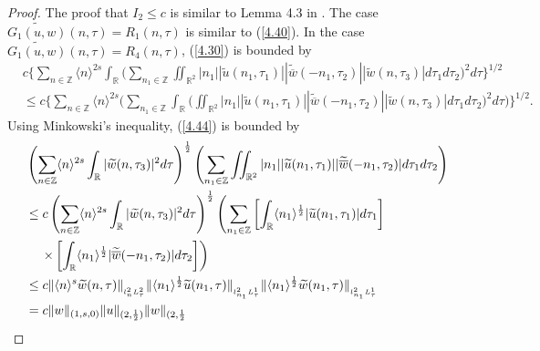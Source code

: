 \documentclass[reqno]{amsart}
\numberwithin{equation}{section}
\begin{document}
\begin{proof}
The proof that $I_{2}\leq c$ is similar to Lemma 4.3 in \cite{38}.
The case $\widetilde{G_{1}(u,w)}(n,\tau)=R_{1}(n,\tau)$ is similar to (\ref{4.40}). In the case
$\widetilde{G_{1}(u,w)}(n,\tau)=R_{4}(n,\tau)$, (\ref{4.30}) is bounded by
\begin{equation}\label{4.44}
\begin{split}
& c\Big\{\sum\limits_{n\in\mathbb{Z}}\langle n\rangle^{2s}\int\nolimits_{\mathbb{R}}\!\!
\Big( \sum\limits_{n_{1}\in\mathbb{Z}}\iint\nolimits_{\mathbb{R}^{2}}|n_1| |\widetilde{u}(n_1,\tau_1)|
|\widetilde{\overline{w}}(-n_1,\tau_2)| |\widetilde{w}(n,\tau_3)| d\tau_1d\tau_2\Big) ^{2}d\tau\Big\} ^{1/2}\\
&\leq c\Big\{  \sum\limits_{n\in\mathbb{Z}}\langle n\rangle^{2s}
\Big( \sum\limits_{n_{1}\in\mathbb{Z}}\int\nolimits_{\mathbb{R}}\Big(
\iint\nolimits_{\mathbb{R}^{2}}\!\!| n_1||\widetilde{u}(n_1,\tau_1)| | \widetilde{\overline{w}}(-n_{1},\tau_{2})|
|\widetilde{w}(n,\tau_3)|d\tau_{1}d\tau_{2}\Big) ^{2}d\tau\Big)\Big\} ^{1/2}.
\end{split}
\end{equation}
Using Minkowski's inequality, (\ref{4.44}) is bounded by
\begin{align*}
&  \left(  \sum\limits_{n\in\mathbb{Z}}\langle n\rangle^{2s}\int
\nolimits_{\mathbb{R}}|\widetilde{w}(n,\tau_3)| ^{2}d\tau\right) ^{\frac{1}{2}}
\left(  \sum\limits_{n_{1}\in\mathbb{Z}}\iint\nolimits_{\mathbb{R}^{2}}|n_1|
 |\widetilde{u}(n_1,\tau_1)| | \widetilde{\overline{w}}(-n_{1},\tau_{2})| d\tau_{1}d\tau_{2}\right) \\
&  \leq c\left(  \sum\limits_{n\in\mathbb{Z}}\langle n\rangle^{2s}
\int\nolimits_{\mathbb{R}}|\widetilde{w}(n,\tau_3)| ^{2}d\tau\right)  ^{\frac{1}{2}}
\left(  \sum\limits_{n_{1}\in\mathbb{Z}}\left[  \int\nolimits_{\mathbb{R}}\langle n_{1}\rangle^{\frac {1}{2}}|
\widetilde{u}(n_{1},\tau_{1})| d\tau_{1}\right]
\right. \\
& \hspace{0.4cm} \left.  \times\left[  \int\nolimits_{\mathbb{R}}\langle
n_{1}\rangle ^{\frac{1}{2}}|\widetilde{\overline{w}}(-n_{1},\tau_{2})|
d\tau_{2}\right]  \right) \\
&  \leq c\| \langle
n\rangle^{s}\widetilde{w}(n,\tau)\|
_{_{l_{n}^{2}L_{\tau}^{2}}}\| \langle n_{1}\rangle^{\frac{1}{2}}\widetilde{u}(n_{1},\tau)\| _{_{l_{n_{1}}^{2}L_{\tau}^{1}}}\| \langle n_{1}\rangle^{\frac{1}{2}}\widetilde{w}(n_{1},\tau)\| _{_{l_{n_{1}}^{2}L_{\tau}^{1}}}\\
&  =c\| w\| _{(1,s,0)}\| u\| _{(2,\frac12)}\| w\| _{(2,\frac12
}
\end{align*}
\end{proof}
\end{document}
